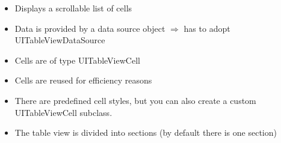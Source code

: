 \begin{breakbox}

\begin{itemize}
\tightlist
\item
  Displays a scrollable list of cells
\item
  Data is provided by a data source object $\Rightarrow$ has to adopt
  UITableViewDataSource
\item
  Cells are of type UITableViewCell
\item
  Cells are reused for efficiency reasons
\item
  There are predefined cell styles, but you can also create a custom
  UITableViewCell subclass.
\item
  The table view is divided into sections (by default there is one
  section)
\end{itemize}
\end{breakbox}